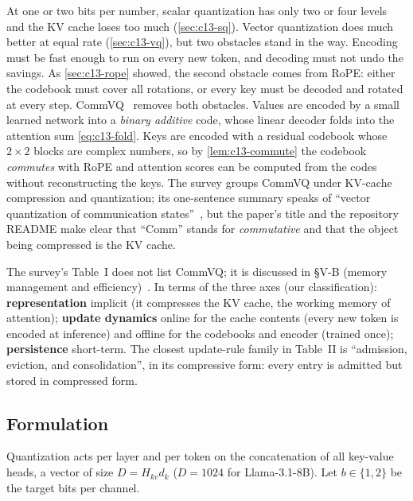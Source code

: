 At one or two bits per number, scalar quantization has only two or four levels and the KV cache
loses too much (\cref{sec:c13-sq}). Vector quantization does much better at equal rate
(\cref{sec:c13-vq}), but two obstacles stand in the way. Encoding must be fast enough to run on every
new token, and decoding must not undo the savings. As \cref{sec:c13-rope} showed, the second obstacle
comes from RoPE: either the codebook must cover all rotations, or every key must be decoded and rotated
at every step. CommVQ~\citep{li2025commvq} removes both obstacles. Values are encoded by a small learned
network into a \emph{binary additive} code, whose linear decoder folds into the attention sum
\eqref{eq:c13-fold}. Keys are encoded with a residual codebook whose $2\times2$ blocks are complex
numbers, so by \cref{lem:c13-commute} the codebook \emph{commutes} with RoPE and attention scores can
be computed from the codes without reconstructing the keys. The survey groups CommVQ under KV-cache
compression and quantization; its one-sentence summary speaks of ``vector quantization of communication
states''~\citep{zhoubian2026memory}, but the paper's title and the repository README make clear that
``Comm'' stands for \emph{commutative} and that the object being compressed is the KV cache.

\begin{taxonomy}
The survey's Table~I does not list CommVQ; it is discussed in \S V-B (memory management and
efficiency)~\citep{zhoubian2026memory}. In terms of the three axes (our classification):
\textbf{representation} implicit (it compresses the KV cache, the working memory of attention);
\textbf{update dynamics} online for the cache contents (every new token is encoded at inference) and
offline for the codebooks and encoder (trained once); \textbf{persistence} short-term. The closest
update-rule family in Table~II is ``admission, eviction, and consolidation'', in its compressive
form: every entry is admitted but stored in compressed form.
\end{taxonomy}

\subsection{Formulation}\label{sec:c13-commvq-form}

Quantization acts per layer and per token on the concatenation of all key-value heads, a vector of
size $D=H_{kv}d_k$ ($D=1024$ for Llama-3.1-8B). Let $b\in\{1,2\}$ be the target bits per channel.

